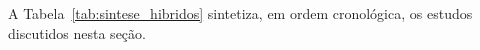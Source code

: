 A Tabela~\ref{tab:sintese_hibridos} sintetiza, em ordem cronológica, os estudos discutidos nesta seção.

